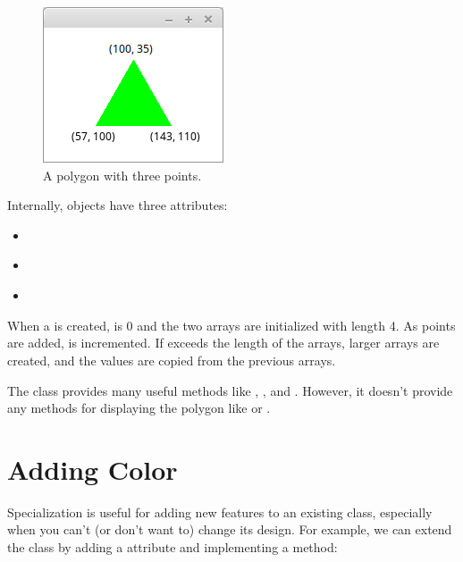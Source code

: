 \begin{figure}[!ht]
\begin{center}
\includegraphics{figs/triangle.png}
\caption{A polygon with three points.}
\label{fig:triangle}
\end{center}
\end{figure}

Internally,  objects have three attributes:

\begin{itemize}
\item {} {\tt ~~~} 
\item {} {\tt ~} 
\item {} {\tt ~} 
\end{itemize}

When a  is created,  is 0 and the two arrays are initialized with length 4.
As points are added,  is incremented.
If  exceeds the length of the arrays, larger arrays are created, and the values are copied from the previous arrays.

The  class provides many useful methods like , , and .
However, it doesn't provide any methods for displaying the polygon like  or .


\section{Adding Color}

Specialization is useful for adding new features to an existing class, especially when you can't (or don't want to) change its design.
For example, we can extend the  class by adding a  attribute and implementing a  method:

